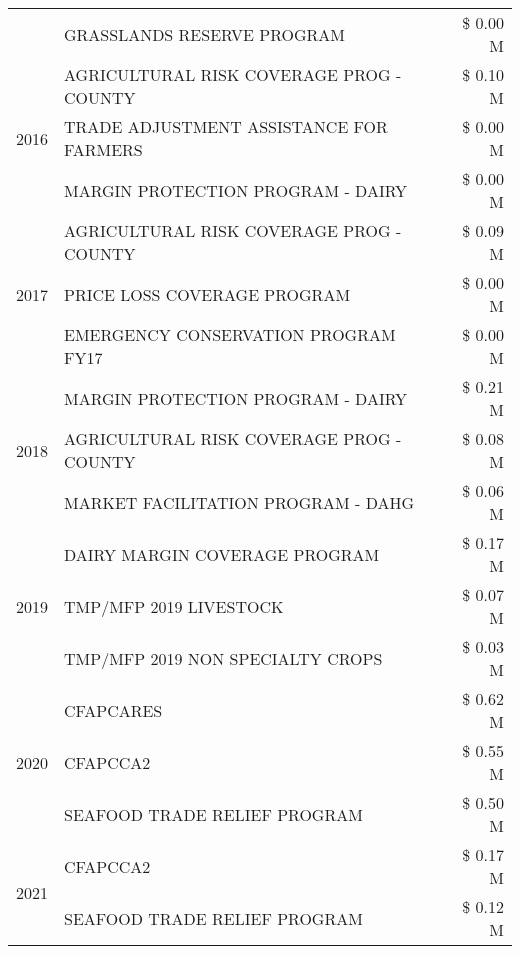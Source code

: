 \begin{tabular}{llr}
 & GRASSLANDS RESERVE PROGRAM & \$ 0.00 M \\
\cline{1-3}
\multirow[t]{3}{*}{2016} & AGRICULTURAL RISK COVERAGE PROG - COUNTY & \$ 0.10 M \\
 & TRADE ADJUSTMENT ASSISTANCE FOR FARMERS & \$ 0.00 M \\
 & MARGIN PROTECTION PROGRAM - DAIRY & \$ 0.00 M \\
\cline{1-3}
\multirow[t]{3}{*}{2017} & AGRICULTURAL RISK COVERAGE PROG - COUNTY & \$ 0.09 M \\
 & PRICE LOSS COVERAGE PROGRAM & \$ 0.00 M \\
 & EMERGENCY CONSERVATION PROGRAM FY17 & \$ 0.00 M \\
\cline{1-3}
\multirow[t]{3}{*}{2018} & MARGIN PROTECTION PROGRAM - DAIRY & \$ 0.21 M \\
 & AGRICULTURAL RISK COVERAGE PROG - COUNTY & \$ 0.08 M \\
 & MARKET FACILITATION PROGRAM - DAHG & \$ 0.06 M \\
\cline{1-3}
\multirow[t]{3}{*}{2019} & DAIRY MARGIN COVERAGE PROGRAM & \$ 0.17 M \\
 & TMP/MFP 2019 LIVESTOCK & \$ 0.07 M \\
 & TMP/MFP 2019 NON SPECIALTY CROPS & \$ 0.03 M \\
\cline{1-3}
\multirow[t]{3}{*}{2020} & CFAPCARES & \$ 0.62 M \\
 & CFAPCCA2 & \$ 0.55 M \\
 & SEAFOOD TRADE RELIEF PROGRAM & \$ 0.50 M \\
\cline{1-3}
\multirow[t]{2}{*}{2021} & CFAPCCA2 & \$ 0.17 M \\
 & SEAFOOD TRADE RELIEF PROGRAM & \$ 0.12 M \\
\cline{1-3}
\bottomrule
\end{tabular}
